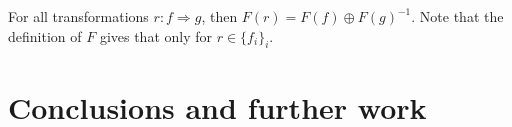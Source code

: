 \documentclass[a4paper]{article}
\begin{document}
\begin{corollary}
For all transformations $r: f \Rightarrow g$, then $F(r) = F(f) \oplus F(g)^{-1}$.
Note that the definition of $F$ gives that only for $r \in \{f_i\}_i$.
\end{corollary}


\section{Conclusions and further work}
\label{sec:conclusion}



\small

\end{document}
